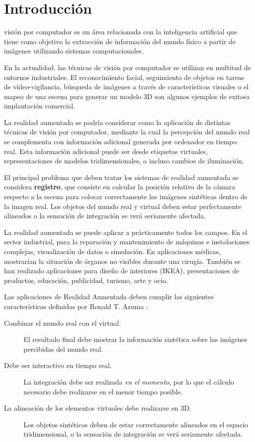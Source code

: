 \chapter{Introducción}

 visión por computador es un área relacionada con la inteligencia artificial que tiene como objetivo la extracción de información del mundo físico a partir de imágenes utilizando sistemas computacionales. 

En la actualidad, las técnicas de visión por computador se utilizan en multitud de entornos industriales. El reconocimiento facial, seguimiento de objetos en tareas de vídeo-vigilancia, búsqueda de imágenes a través de características visuales o el mapeo de una escena para generar un modelo 3D son algunos ejemplos de exitosa implantación comercial.

La realidad aumentada se podría considerar como la aplicación de distintas técnicas de visión por computador, mediante la cual la percepción del mundo real se complementa con información adicional generada por ordenador en tiempo real. Esta información adicional puede ser desde etiquetas virtuales, representaciones de modelos tridimensionales, o incluso cambios de iluminación. 

El principal problema que deben tratar los sistemas de realidad aumentada se considera \textbf{registro}, que consiste en calcular la posición relativa de la cámara respecto a la escena para colocar correctamente las imágenes sintéticas dentro de la imagen real. Los objetos del mundo real y virtual deben estar perfectamente alineados o la sensación de integración se verá seriamente afectada.

La realidad aumentada se puede aplicar a prácticamente todos los campos. En el sector industrial, para la reparación y mantenimiento de máquinas e instalaciones complejas, visualización de datos o simulación.  En aplicaciones médicas, mostrarían la situación de órganos no visibles durante una cirugía. También se han realizado aplicaciones para diseño de interiores (IKEA), presentaciones de productos, educación, publicidad, turismo, arte y ocio. 

Las aplicaciones de Realidad Aumentada deben cumplir las siguientes características definidas por Ronald T. Azuma \cite{Azuma}:

\begin{description}
\item[Combinar el mundo real con el virtual.] El resultado final debe mostrar la información sintética sobre las imágenes percibidas del mundo real.
\item[Debe ser interactivo en tiempo real.] La integración debe ser realizada \emph{en el momento}, por lo que el cálculo necesario debe realizarse en el menor tiempo posible.
\item[La alineación de los elementos virtuales debe realizarse en 3D.] Los objetos sintéticos deben de estar correctamente alineados en el espacio tridimensional,  o la sensación de integración se verá seriamente afectada.
\end{description}

